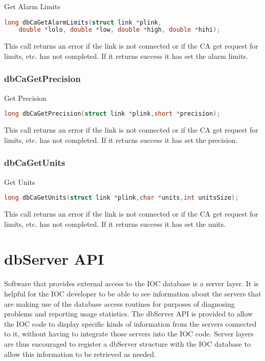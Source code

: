 Get Alarm Limits

\begin{lstlisting}[language=C]
long dbCaGetAlarmLimits(struct link *plink,
    double *lolo, double *low, double *high, double *hihi);
\end{lstlisting}

This call returns an error if the link is not connected or if the CA get request for limits, etc. has not completed.
If it returns success it has set the alarm limits.

\subsubsection{dbCaGetPrecision}

Get Precision

\begin{lstlisting}[language=C]
long dbCaGetPrecision(struct link *plink,short *precision);
\end{lstlisting}

This call returns an error if the link is not connected or if the CA get request for limits, etc. has not completed.
If it returns success it has set the precision.

\subsubsection{dbCaGetUnits}

Get Units

\begin{lstlisting}[language=C]
long dbCaGetUnits(struct link *plink,char *units,int unitsSize);
\end{lstlisting}

This call returns an error if the link is not connected or if the CA get request for limits, etc. has not completed.
If it returns success it has set the units.

\section{dbServer API}

Software that provides external access to the IOC database is a server layer.
It is helpful for the IOC developer to be able to see information about the servers that are making use of the database access routines for purposes of diagnosing problems and reporting usage statistics.
The dbServer API is provided to allow the IOC code to display specific kinds of information from the servers connected to it, without having to integrate those servers into the IOC code.
Server layers are thus encouraged to register a dbServer structure with the IOC database to allow this information to be retrieved as needed.

